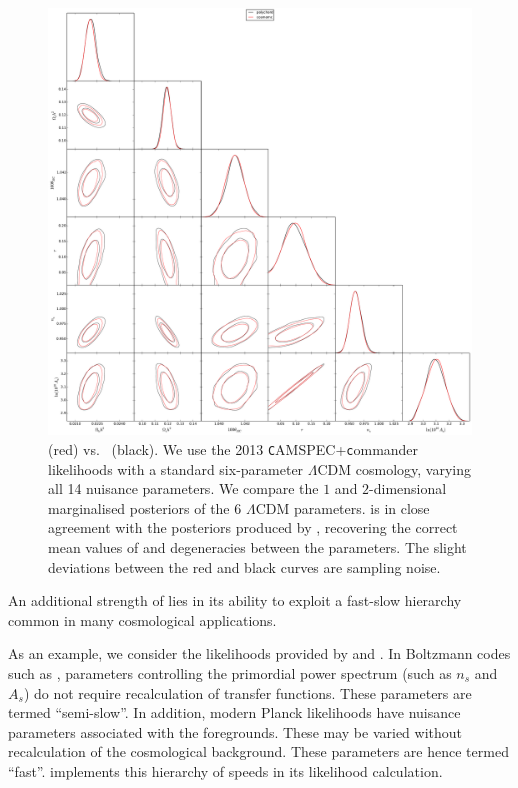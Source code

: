 \begin{figure}[tp]
  \centering
  \includegraphics[width=\textwidth]{chapters/polychord/figures/cosmochord}
  \caption{\CosmoChord{} (red) vs.\ \CosmoMC{} (black). We use the 2013 {\texttt CAMSPEC}+{\texttt commander} likelihoods with a standard six-parameter \(\Lambda\)CDM cosmology, varying all 14 nuisance parameters.  We compare the \(1\) and \(2\)-dimensional marginalised posteriors of the \(6\) \(\Lambda\)CDM parameters. \CosmoChord{} is in close agreement with the posteriors produced by \CosmoMC{}, recovering the correct mean values of and degeneracies between the parameters. The slight deviations between the red and black curves are sampling noise.}\label{fig:pc:cosmochord}
\end{figure}

An additional strength of \PolyChord{} lies in its ability to exploit a fast-slow hierarchy common in many cosmological applications. 

As an example, we consider the likelihoods provided by \CAMB{} \citep{CAMB} and \CosmoMC{} \citep{cosmomc}. In Boltzmann codes such as \CAMB{}, parameters controlling the primordial power spectrum (such as \(n_s\) and \(A_s\)) do not require recalculation of transfer functions. These parameters are termed ``semi-slow''. In addition, modern Planck likelihoods \citep{Planck2013Like} have nuisance parameters associated with the foregrounds. These may be varied without recalculation of the cosmological background. These parameters are hence termed ``fast''. \CosmoMC{} \citep{cosmomc} implements this hierarchy of speeds in its likelihood calculation.

